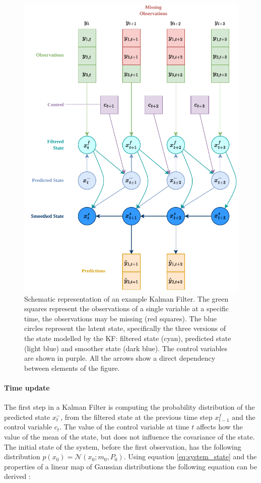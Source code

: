 \documentclass{article}
\newcommand{\norm}[3]{\mathcal{N}\left(#1; #2, #3\right)} %
\begin{document}
\begin{figure}
\centerline{\includegraphics[width=4.5in]{Kalman Filter figure}}
\caption{Schematic representation of an example Kalman Filter. The green squares represent the observations of a single variable at a specific time, the observations may be missing (red squares). The blue circles represent the latent state, specifically the three versions of the state modelled by the KF: filtered state (cyan), predicted state (light blue) and smoother state (dark blue). The control variables are shown in purple.
All the arrows show a direct dependency between elements of the figure. 
}
\label{fig:kalman_filter}
\end{figure}

\paragraph{Time update}

The first step in a Kalman Filter is computing the probability distribution of the predicted state $x^-_t$, from the filtered state at the previous time step $x^f_{t-1}$ and the control variable $c_t$.
The value of the control variable at time $t$ affects how the value of the mean of the state, but does not influence the covariance of the state.
The initial state of the system, before the first observation, has the following distribution $p(x_0) = \norm{x_0}{m_0}{P_0}$. Using equation \ref{eq:system_state} and the properties of a linear map of Gaussian distributions the following equation can be derived \cite{bishop_pattern_2006, 2020_hennig_pml}:
\end{document}
